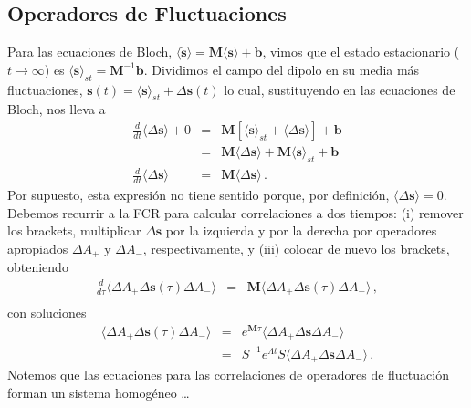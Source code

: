 \documentclass[twocolumn,aps,eqsecnum]{revtex4}
\begin{document}
\subsection{Operadores de Fluctuaciones}
Para las ecuaciones de Bloch, $\langle \mathbf{\dot{s}} \rangle = 
\mathbf{M} \langle \mathbf{s} \rangle +\mathbf{b}$, vimos que el estado 
estacionario ($t \to \infty$) es 
$\langle \mathbf{s} \rangle_{st} =\mathbf{M}^{-1} \mathbf{b}$. Dividimos 
el campo del dipolo en su media m\'as fluctuaciones, 
$\mathbf{s}(t) = \langle \mathbf{s} \rangle_{st} +\Delta \mathbf{s}(t)$  
lo cual, sustituyendo en las ecuaciones de Bloch, nos lleva a  
%
\begin{eqnarray}
\frac{d}{dt} \langle \Delta \mathbf{s} \rangle +0
&=& \mathbf{M} \left[ \langle \mathbf{s} \rangle_{st} 
	+\langle \Delta \mathbf{s} \rangle \right] +\mathbf{b}  \nonumber \\
&=& \mathbf{M} \langle \Delta \mathbf{s} \rangle 
	+\mathbf{M} \langle \mathbf{s} \rangle_{st} +\mathbf{b}  
	\nonumber 	\\
\frac{d}{dt} \langle \Delta \mathbf{s} \rangle 
	&=& \mathbf{M} \langle \Delta \mathbf{s} \rangle  \,.
\end{eqnarray}
Por supuesto, esta expresi\'on no tiene sentido porque, por definici\'on, 
$\langle \Delta \mathbf{s} \rangle =0$. Debemos recurrir a la FCR para 
calcular correlaciones a dos tiempos: (i) remover los brackets, multiplicar  
$\Delta \mathbf{s}$ por la izquierda y por la derecha por operadores 
apropiados $\Delta A_+$ y $\Delta A_-$, respectivamente, y (iii) colocar 
de nuevo los brackets, obteniendo 
%
\begin{eqnarray}
\frac{d}{d\tau} \langle \Delta A_+ \Delta \mathbf{s}(\tau) \Delta A_- \rangle 
 &=& \mathbf{M} \langle \Delta A_+ \Delta \mathbf{s}(\tau) \Delta A_- \rangle  \,, 
	\nonumber \\
\end{eqnarray}
con soluciones 
%
\begin{eqnarray*}
\langle \Delta A_+ \Delta \mathbf{s}(\tau) \Delta A_- \rangle 
 &=& e^{\mathbf{M} \tau} \langle \Delta A_+ \Delta \mathbf{s} 
 	\Delta A_- \rangle  	\\ 
&=& S^{-1} e^{\Lambda t} S  \langle \Delta A_+ \Delta \mathbf{s} 
 	\Delta A_- \rangle 	\,.	
\end{eqnarray*}
Notemos que las ecuaciones para las correlaciones de operadores de 
fluctuaci\'on forman un sistema homog\'eneo \ldots

\end{document}
